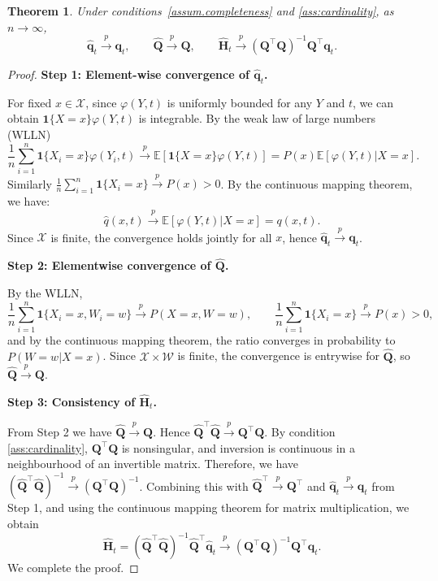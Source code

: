 \documentclass[
  12pt]{article}
\newtheorem{theorem}{Theorem}
\def\to{\rightarrow}
\begin{document}
\begin{theorem}\label{thm:consistency}
Under conditions~\ref{assum.completeness} and \ref{ass:cardinality}, as $n\to\infty$,
$$
\widehat{\mathbf{q}}_t \xrightarrow{p} \mathbf{q}_t,\qquad
\widehat{\mathbf{Q}} \xrightarrow{p} \mathbf{Q},\qquad
\widehat{\mathbf{H}}_t \xrightarrow{p} (\mathbf{Q}^\top\mathbf{Q})^{-1}\mathbf{Q}^\top\mathbf{q}_t.
$$
\end{theorem}
\begin{proof}
    \noindent\textbf{Step 1: Element-wise convergence of $\widehat{\mathbf{q}}_t$.}

For fixed $x\in\mathcal{X}$, since $\varphi(Y,t)$ is uniformly bounded for any $Y$ and $t$, we can obtain $\mathbf{1}\{X=x\}\varphi(Y,t)$ is integrable. By the weak law of large numbers (WLLN)
$$
\frac{1}{n}\sum_{i=1}^n \mathbf{1}\{X_i=x\}\varphi(Y_i,t) \xrightarrow{p} \mathbb{E}[\mathbf{1}\{X=x\}\varphi(Y,t)]
= P(x)\mathbb{E}[\varphi(Y,t)| X=x].
$$
Similarly $\frac{1}{n}\sum_{i=1}^n \mathbf{1}\{X_i=x\}\xrightarrow{p} P(x)>0$. By the continuous mapping theorem, we have:
$$
\widehat{q}(x,t)\xrightarrow{p}\mathbb{E}[\varphi(Y,t)| X=x]=q(x,t).
$$
Since $\mathcal{X}$ is finite, the convergence holds jointly for all $x$, hence $\widehat{\mathbf{q}}_t\xrightarrow{p}\mathbf{q}_t$.

\noindent\textbf{Step 2: Elementwise convergence of $\widehat{\mathbf{Q}}$.}

By the WLLN,
$$
\frac{1}{n}\sum_{i=1}^n \mathbf{1}\{X_i=x,W_i=w\}\xrightarrow{p}P(X=x,W=w),
\qquad
\frac{1}{n}\sum_{i=1}^n \mathbf{1}\{X_i=x\}\xrightarrow{p}P(x)>0,
$$
and by the continuous mapping theorem, the ratio converges in probability to
$P(W=w| X=x)$. Since $\mathcal{X}\times\mathcal{W}$ is finite, the convergence is entrywise for $\widehat{\mathbf{Q}}$, so $\widehat{\mathbf{Q}}\xrightarrow{p}\mathbf{Q}$.

\noindent\textbf{Step 3: Consistency of $\widehat{\mathbf{H}}_t$.}

From Step 2 we have $\widehat{\mathbf{Q}}\xrightarrow{p}\mathbf{Q}$. Hence $\widehat{\mathbf{Q}}^\top\widehat{\mathbf{Q}}\xrightarrow{p}\mathbf{Q}^\top\mathbf{Q}$. By condition \ref{ass:cardinality}, $\mathbf{Q}^\top\mathbf{Q}$ is nonsingular, and inversion is continuous in a neighbourhood of an invertible matrix. Therefore, we have $(\widehat{\mathbf{Q}}^\top\widehat{\mathbf{Q}})^{-1}\xrightarrow{p}(\mathbf{Q}^\top\mathbf{Q})^{-1}$. Combining this with $\widehat{\mathbf{Q}}^\top\xrightarrow{p}\mathbf{Q}^\top$ and $\widehat{\mathbf{q}}_t\xrightarrow{p}\mathbf{q}_t$ from Step 1, and using the continuous mapping theorem for matrix multiplication, we obtain
$$
\widehat{\mathbf{H}}_t
=
(\widehat{\mathbf{Q}}^\top\widehat{\mathbf{Q}})^{-1}\widehat{\mathbf{Q}}^\top\widehat{\mathbf{q}}_t
\xrightarrow{p}
(\mathbf{Q}^\top\mathbf{Q})^{-1}\mathbf{Q}^\top\mathbf{q}_t.
$$
We complete the proof. 
\end{proof}
\end{document}
